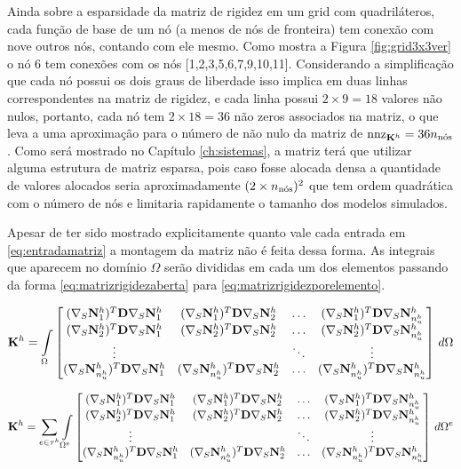 Ainda sobre a esparsidade da matriz de rigidez em um grid com quadriláteros, cada função de base de um nó (a menos de nós de fronteira) tem conexão com nove outros nós, contando com ele mesmo. Como mostra a Figura \ref{fig:grid3x3ver} o nó 6 tem conexões com os nós [1,2,3,5,6,7,9,10,11]. Considerando a simplificação que cada nó possui os dois graus de liberdade isso implica em duas linhas correspondentes na matriz de rigidez, e cada linha possui $2 \times 9 = 18$ valores não nulos, portanto, cada nó tem $2 \times 18 = 36$ não zeros associados na matriz, o que leva a uma aproximação para o número de não nulo da matriz de $\text{nnz}_{\rigidmatrix} = 36 \qtdnos$. Como será mostrado no Capítulo \ref{ch:sistemas}, a matriz terá que utilizar alguma estrutura de matriz esparsa, pois caso fosse alocada densa a quantidade de valores alocados seria aproximadamente $(2 \times \qtdnos)^2$ que tem ordem quadrática com o número de nós e limitaria rapidamente o tamanho dos modelos simulados.


Apesar de ter sido mostrado explicitamente quanto vale cada entrada em \eqref{eq:entradamatriz} a montagem da matriz não é feita dessa forma. As integrais que aparecem no domínio $\Omega$ serão divididas em cada um dos elementos passando da forma \eqref{eq:matrizrigidezaberta} para \eqref{eq:matrizrigidezporelemento}.


\begin{equation}\label{eq:matrizrigidezaberta}
\rigidmatrix  = \omeint{
\begin{bmatrix}
\kij{1}{1} & \kij{1}{2}  & \hdots & \kij{1}{\qtdfreedomfine} \\
\kij{2}{1} & \kij{2}{2}  & \hdots & \kij{2}{\qtdfreedomfine} \\
\vdots &  & \ddots & \vdots\\
\kij{\qtdfreedomfine}{1} & \kij{\qtdfreedomfine}{2}  & \hdots & \kij{\qtdfreedomfine}{\qtdfreedomfine}
\end{bmatrix}
}
\end{equation}


\begin{equation}\label{eq:matrizrigidezporelemento}
\rigidmatrix  = \sum_{e \in \tau^h} \omeeint{
\begin{bmatrix}
\kij{1}{1} & \kij{1}{2}  & \hdots & \kij{1}{\qtdfreedomfine} \\
\kij{2}{1} & \kij{2}{2}  & \hdots & \kij{2}{\qtdfreedomfine} \\
\vdots     &             & \ddots & \vdots\\
\kij{\qtdfreedomfine}{1} & \kij{\qtdfreedomfine}{2}  & \hdots & \kij{\qtdfreedomfine}{\qtdfreedomfine}
\end{bmatrix}
}
\end{equation}


